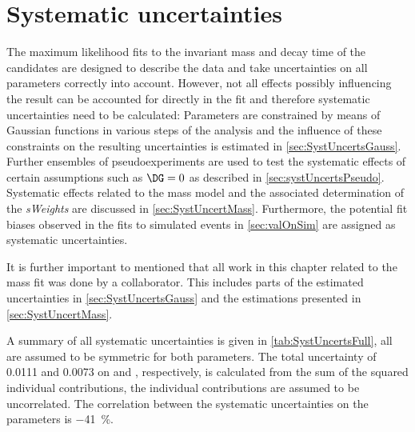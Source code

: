 \chapter{Systematic uncertainties}
\label{ch:systeamticUncerts}

\linespread{1.08}\selectfont
The maximum likelihood fits to the invariant mass and decay time of the \mbox{\BdToDpi} candidates are designed to describe the data and take uncertainties on all parameters correctly into account.
However, not all effects possibly influencing the result can be accounted for directly in the fit and therefore systematic uncertainties need to be calculated:
Parameters are constrained by means of Gaussian functions in various steps of the analysis and the influence of these constraints on the resulting uncertainties is estimated in \cref{sec:SystUncertsGauss}.
Further ensembles of pseudoexperiments are used to test the systematic effects of certain assumptions such as $\DG=0$  as described in \cref{sec:systUncertsPseudo}.
Systematic effects related to the mass model and the associated determination of the \emph{sWeights} are discussed in \cref{sec:SystUncertMass}.
Furthermore, the potential fit biases observed in the fits to simulated events in \cref{sec:valOnSim} are assigned as systematic uncertainties.

It is further important to mentioned that all work in this chapter related to the mass fit was done by a collaborator.
This includes parts of the estimated uncertainties in \cref{sec:SystUncertsGauss} and the estimations presented in \cref{sec:SystUncertMass}.

A summary of all systematic uncertainties is given in \cref{tab:SystUncertsFull}, all are assumed to be symmetric for both \CP parameters.
The total uncertainty of \num{0.0111} and \num{0.0073} on \Sf and \Sfbar, respectively, is calculated from the sum of the squared individual contributions, \ie the individual contributions are assumed to be uncorrelated.
The correlation between the systematic uncertainties on the \CP parameters is \SI{-41}{\percent}.

